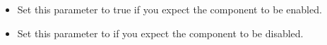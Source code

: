 
\begin{itemize}
\item Set this parameter to true if you expect the component to be enabled.
\item Set this parameter to \gdrefbooleanfalse if you expect the component to be disabled.
\end{itemize}
